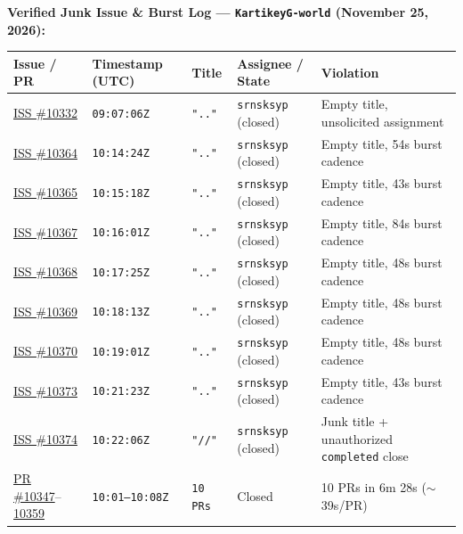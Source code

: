 \documentclass[11pt,a4paper]{article}
\begin{document}
\noindent\textbf{Verified Junk Issue \& Burst Log — \texttt{KartikeyG-world} (November 25, 2026):}
\begin{center}
\small
\begin{tabular}{@{}llllp{6.6cm}@{}}
\toprule
\textbf{Issue / PR} & \textbf{Timestamp (UTC)} & \textbf{Title} & \textbf{Assignee / State} & \textbf{Violation} \\
\midrule
\href{https://github.com/SatyamPandey-07/WorkSphere/issues/10332}{ISS \#10332} & \texttt{09:07:06Z} & \texttt{".."} & \texttt{srnsksyp} (closed) & Empty title, unsolicited assignment \\
\href{https://github.com/SatyamPandey-07/WorkSphere/issues/10364}{ISS \#10364} & \texttt{10:14:24Z} & \texttt{".."} & \texttt{srnsksyp} (closed) & Empty title, 54s burst cadence \\
\href{https://github.com/SatyamPandey-07/WorkSphere/issues/10365}{ISS \#10365} & \texttt{10:15:18Z} & \texttt{".."} & \texttt{srnsksyp} (closed) & Empty title, 43s burst cadence \\
\href{https://github.com/SatyamPandey-07/WorkSphere/issues/10367}{ISS \#10367} & \texttt{10:16:01Z} & \texttt{".."} & \texttt{srnsksyp} (closed) & Empty title, 84s burst cadence \\
\href{https://github.com/SatyamPandey-07/WorkSphere/issues/10368}{ISS \#10368} & \texttt{10:17:25Z} & \texttt{".."} & \texttt{srnsksyp} (closed) & Empty title, 48s burst cadence \\
\href{https://github.com/SatyamPandey-07/WorkSphere/issues/10369}{ISS \#10369} & \texttt{10:18:13Z} & \texttt{".."} & \texttt{srnsksyp} (closed) & Empty title, 48s burst cadence \\
\href{https://github.com/SatyamPandey-07/WorkSphere/issues/10370}{ISS \#10370} & \texttt{10:19:01Z} & \texttt{".."} & \texttt{srnsksyp} (closed) & Empty title, 48s burst cadence \\
\href{https://github.com/SatyamPandey-07/WorkSphere/issues/10373}{ISS \#10373} & \texttt{10:21:23Z} & \texttt{".."} & \texttt{srnsksyp} (closed) & Empty title, 43s burst cadence \\
\href{https://github.com/SatyamPandey-07/WorkSphere/issues/10374}{ISS \#10374} & \texttt{10:22:06Z} & \texttt{"//"} & \texttt{srnsksyp} (closed) & Junk title + unauthorized \texttt{completed} close \\
\href{https://github.com/SatyamPandey-07/WorkSphere/pull/10347}{PR \#10347}--\href{https://github.com/SatyamPandey-07/WorkSphere/pull/10359}{10359} & \texttt{10:01--10:08Z} & \texttt{10 PRs} & Closed & 10 PRs in 6m 28s ($\sim$39s/PR) \\
\bottomrule
\end{tabular}
\end{center}
\end{document}

